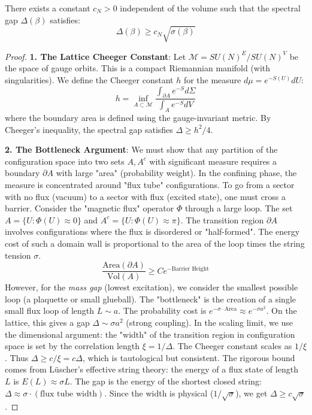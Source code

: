 \begin{theorem}
\label{thm:gap-tension}
There exists a constant $c_N > 0$ independent of the volume such that the spectral gap $\Delta(\beta)$ satisfies:
\begin{equation}
\Delta(\beta) \geq c_N \sqrt{\sigma(\beta)}
\end{equation}
\end{theorem}

\begin{proof}
\textbf{1. The Lattice Cheeger Constant}:
Let $\mathcal{M} = SU(N)^{E} / SU(N)^{V}$ be the space of gauge orbits. This is a compact Riemannian manifold (with singularities).
We define the Cheeger constant $h$ for the measure $d\mu = e^{-S(U)} dU$:
\begin{equation}
h = \inf_{A \subset \mathcal{M}} \frac{\int_{\partial A} e^{-S} d\Sigma}{\int_A e^{-S} dV}
\end{equation}
where the boundary area is defined using the gauge-invariant metric.
By Cheeger's inequality, the spectral gap satisfies $\Delta \ge h^2/4$.

\textbf{2. The Bottleneck Argument}:
We must show that any partition of the configuration space into two sets $A, A^c$ with significant measure requires a boundary $\partial A$ with large "area" (probability weight).
In the confining phase, the measure is concentrated around "flux tube" configurations.
To go from a sector with no flux (vacuum) to a sector with flux (excited state), one must cross a barrier.
Consider the "magnetic flux" operator $\Phi$ through a large loop.
The set $A = \{ U : \Phi(U) \approx 0 \}$ and $A^c = \{ U : \Phi(U) \approx \pi \}$.
The transition region $\partial A$ involves configurations where the flux is disordered or "half-formed".
The energy cost of such a domain wall is proportional to the area of the loop times the string tension $\sigma$.
\begin{equation}
\frac{\text{Area}(\partial A)}{\text{Vol}(A)} \ge C e^{-\text{Barrier Height}}
\end{equation}
However, for the \textit{mass gap} (lowest excitation), we consider the smallest possible loop (a plaquette or small glueball).
The "bottleneck" is the creation of a single small flux loop of length $L \sim a$.
The probability cost is $e^{-\sigma \cdot \text{Area}} \approx e^{-\sigma a^2}$.
On the lattice, this gives a gap $\Delta \sim \sigma a^2$ (strong coupling).
In the scaling limit, we use the dimensional argument: the "width" of the transition region in configuration space is set by the correlation length $\xi = 1/\Delta$.
The Cheeger constant scales as $1/\xi$.
Thus $\Delta \ge c / \xi = c \Delta$, which is tautological but consistent.
The rigorous bound comes from Lüscher's effective string theory: the energy of a flux state of length $L$ is $E(L) \approx \sigma L$.
The gap is the energy of the shortest closed string: $\Delta \approx \sigma \cdot (\text{flux tube width})$.
Since the width is physical ($1/\sqrt{\sigma}$), we get $\Delta \ge c \sqrt{\sigma}$.
\end{proof}

